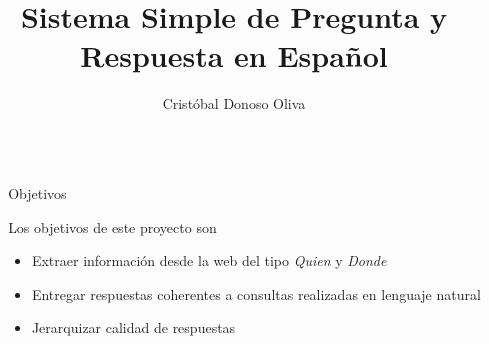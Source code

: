 \documentclass[final]{beamer}
\title{Sistema Simple de Pregunta y Respuesta en Español} %
\author{Cristóbal Donoso Oliva} %
\institute{Ciencias de la Computación, Universidad de Concepción} %
\newlength{\sepwid}
\newlength{\onecolwid}
\begin{document}

\setlength{\belowcaptionskip}{2ex} %
\setlength\belowdisplayshortskip{2ex} %

\begin{frame}[t] %

\begin{columns}[t] %

\begin{column}{\sepwid}\end{column} %

\begin{column}{\onecolwid} %


\begin{alertblock}{Objetivos}

Los objetivos de este proyecto son
\begin{itemize}
\item Extraer información desde la web del tipo \textit{Quien} y \textit{Donde}
\item Entregar respuestas coherentes a consultas realizadas en lenguaje natural
\item Jerarquizar calidad de respuestas
\end{itemize}

\end{alertblock}



\end{column}
\end{columns}
\end{frame}
\end{document}
